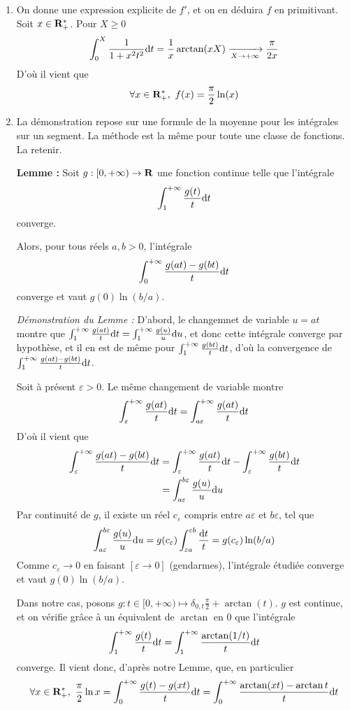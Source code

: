 \begin{correction}
\begin{enumerate}
		\item On donne une expression explicite de $f'$, et on en déduira $f$ en primitivant. Soit $x\in{\mathbf R}_{+}^*$.
		Pour $X\geq 0$
		\[
			\int_0^X\frac1{1+x^2t^2}\mathrm{d} t=\frac1x\arctan(xX)\xrightarrow[X\to+\infty]{}\frac\pi{2x}
		\]
		D'où il vient que
		\[
			\forall x\in\Rpe,\ f(x)=\frac\pi2\ln(x)	
		\]

		\item La démonstration repose sur une formule de la moyenne pour les intégrales sur un segment.
		La méthode est la même pour toute une classe de fonctions. La retenir. 

		\textbf{Lemme :} Soit $g:[0,+\infty)\to \operatorname{\mathbf{R}}$ une fonction continue telle que l'intégrale
		\[
			\int_1^{+\infty}\frac{g(t)}t\mathrm{d} t	
		\]
		converge. 

		Alors, pour tous réels $a,b>0$, l'intégrale 
		\[
			\int_0^{+\infty}\frac{g(at)-g(bt)}t\mathrm{d} t	
		\]
		converge et vaut $g(0)\ln(b/a)$.

		\textit{Démonstration du Lemme :} 
		D'abord, le changemnet de variable $u=at$ montre que $\int_1^{+\infty}\frac{g(at)}t\mathrm{d} t=\int_1^{+\infty}\frac{g(u)}u\mathrm{d} u$,
		et donc cette intégrale converge par hypothèse, et il en est de même pour $\int_1^{+\infty}\frac{g(bt)}t\mathrm{d} t$, d'où la convergence de $\int_1^{+\infty}\frac{g(at)-g(bt)}t\mathrm{d} t$.

		Soit à présent $\varepsilon > 0$. 
		Le même changement de variable montre 
		\[
			\int_\varepsilon^{+\infty} \frac{g(at)}t\mathrm{d} t = \int_{a\varepsilon}^{+\infty}\frac{g(at)}t\mathrm{d} t
		\]
		D'où il vient que 
		\begin{align*}
			\int_\varepsilon^{+\infty} \frac{g(at)-g(bt)}t\mathrm{d} t &=\int_\varepsilon^{+\infty} \frac{g(at)}t\mathrm{d} t-\int_\varepsilon^{+\infty} \frac{g(bt)}t\mathrm{d} t\\
															   &=\int_{a\varepsilon}^{b\varepsilon} \frac{g(u)}u\mathrm{d} u
		\end{align*}
		Par continuité de $g$, il existe un réel $c_\varepsilon$ compris entre $a\varepsilon$ et $b\varepsilon$, tel que 
		\[
			\int_{a\varepsilon}^{b\varepsilon} \frac{g(u)}u\mathrm{d} u=g(c_\varepsilon)\int_{\varepsilon a}^{\varepsilon b}\frac{\mathrm{d} t}t=g(c_\varepsilon)\ln(b/a)
		\]
		Comme $c_\varepsilon \to 0$ en faisant $[\varepsilon\to 0]$ (gendarmes), l'intégrale étudiée converge et vaut $g(0)\ln(b/a)$.


		Dans notre cas, posons $g:t\in[0,+\infty)\mapsto \delta_{0,t}\frac\pi2+\arctan(t)$.
		$g$ est continue, et on vérifie grâce à un équivalent de $\arctan$ en $0$ que l'intégrale 
		\[
			\int_1^{+\infty}\frac{g(t)}t\mathrm{d} t = \int_1^{+\infty}\frac{\arctan(1/t)}t\mathrm{d} t 
		\]
		converge.
		Il vient donc, d'après notre Lemme, que, en particulier
		\[
			\forall x\in{\mathbf R}_{+}^*,\ \frac\pi2\ln x=\int_0^{+\infty}\frac{g(t)-g(xt)}t\mathrm{d} t =\int_0^{+\infty}\frac{\arctan(xt)-\arctan t}t\mathrm{d} t
		\]
	\end{enumerate}
\end{correction}

